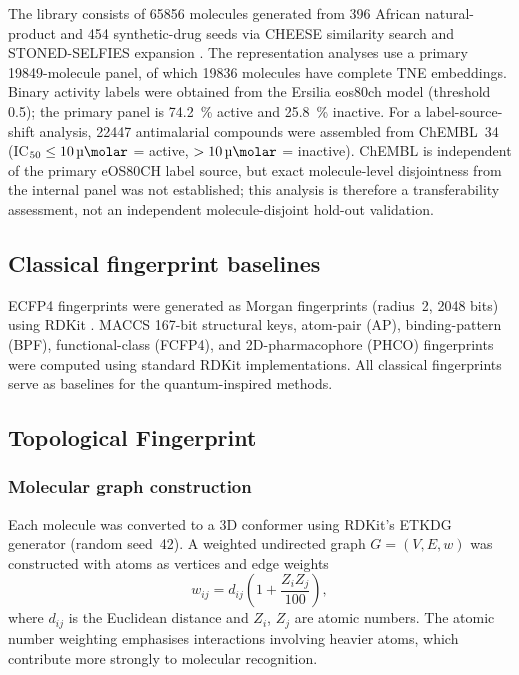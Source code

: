 \documentclass[11pt,a4paper]{article}
\begin{document}
The library consists of \num{65856} molecules generated from \num{396} African natural-product and \num{454} synthetic-drug seeds via CHEESE similarity search \citep{lzicar_cheese_2024} and STONED-SELFIES expansion \citep{temgoua2026antimalarial}. The representation analyses use a primary \num{19849}-molecule panel, of which \num{19836} molecules have complete TNE embeddings. Binary activity labels were obtained from the Ersilia eos80ch model (threshold \num{0.5}); the primary panel is \qty{74.2}{\percent} active and \qty{25.8}{\percent} inactive. For a label-source-shift analysis, \num{22447} antimalarial compounds were assembled from ChEMBL~34 (IC$_{50} \leq \SI{10}{\micro\molar}$ = active, $> \SI{10}{\micro\molar}$ = inactive). ChEMBL is independent of the primary eOS80CH label source, but exact molecule-level disjointness from the internal panel was not established; this analysis is therefore a transferability assessment, not an independent molecule-disjoint hold-out validation.

\subsection{Classical fingerprint baselines}

ECFP4 fingerprints were generated as Morgan fingerprints (radius~2, \num{2048} bits) using RDKit \citep{rdkit_2024}. MACCS \num{167}-bit structural keys, atom-pair (AP), binding-pattern (BPF), functional-class (FCFP4), and 2D-pharmacophore (PHCO) fingerprints were computed using standard RDKit implementations. All classical fingerprints serve as baselines for the quantum-inspired methods.

\subsection{Topological Fingerprint}

\subsubsection{Molecular graph construction}

Each molecule was converted to a 3D conformer using RDKit's ETKDG generator (random seed~42). A weighted undirected graph $G = (V, E, w)$ was constructed with atoms as vertices and edge weights
\begin{equation}
w_{ij} = d_{ij}\left(1 + \frac{Z_i Z_j}{100}\right),
\end{equation}
where $d_{ij}$ is the Euclidean distance and $Z_i$, $Z_j$ are atomic numbers. The atomic number weighting emphasises interactions involving heavier atoms, which contribute more strongly to molecular recognition.
\end{document}
